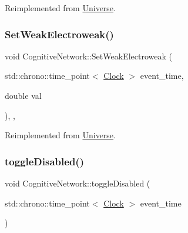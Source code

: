 Reimplemented from \mbox{\hyperlink{classUniverse_a0f5cd04081b41ee931c0557dc397f6fb}{Universe}}.

\mbox{\label{classCognitiveNetwork_a116f6818986a622e4a318857859e2495}} 
\subsubsection{\texorpdfstring{Set\+Weak\+Electroweak()}{SetWeakElectroweak()}}
{\footnotesize\ttfamily void Cognitive\+Network\+::\+Set\+Weak\+Electroweak (\begin{DoxyParamCaption}\item[{std\+::chrono\+::time\+\_\+point$<$ \mbox{\hyperlink{universe_8h_a0ef8d951d1ca5ab3cfaf7ab4c7a6fd80}{Clock}} $>$}]{event\+\_\+time,  }\item[{double}]{val }\end{DoxyParamCaption})\hspace{0.3cm}{\ttfamily [inline]}, {\ttfamily [final]}, {\ttfamily [virtual]}}



Reimplemented from \mbox{\hyperlink{classUniverse_a2d3d642bfdc863248e93535832fa4b00}{Universe}}.

\mbox{\label{classCognitiveNetwork_abeac08d7cbf9df4b36de40aa9301e978}} 
\subsubsection{\texorpdfstring{toggle\+Disabled()}{toggleDisabled()}}
{\footnotesize\ttfamily void Cognitive\+Network\+::toggle\+Disabled (\begin{DoxyParamCaption}\item[{std\+::chrono\+::time\+\_\+point$<$ \mbox{\hyperlink{universe_8h_a0ef8d951d1ca5ab3cfaf7ab4c7a6fd80}{Clock}} $>$}]{event\+\_\+time }\end{DoxyParamCaption})\hspace{0.3cm}{\ttfamily [inline]}}

\mbox{\label{classCognitiveNetwork_a05dccc7759456df13a732899a8f1f4c4}} 
